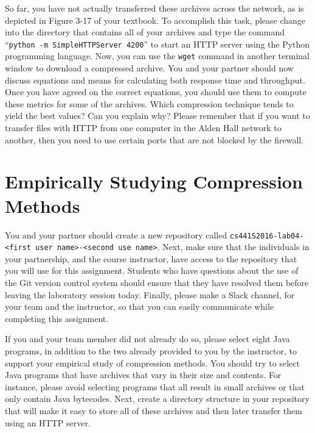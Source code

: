 So far, you have not actually transferred these archives across the network, as is depicted in Figure 3-17 of your
textbook. To accomplish this task, please change into the directory that contains all of your archives and type the
command ``{\tt python -m SimpleHTTPServer 4200}'' to start an HTTP server using the Python programming language. Now,
you can use the {\tt wget} command in another terminal window to download a compressed archive. You and your partner
should now discuss equations and means for calculating both response time and throughput. Once you have agreed on the
correct equations, you should use them to compute these metrics for some of the archives. Which compression technique
tends to yield the best values? Can you explain why? Please remember that if you want to transfer files with HTTP from
one computer in the Alden Hall network to another, then you need to use certain ports that are not blocked by the
firewall.

\section*{Empirically Studying Compression Methods}

You and your partner should create a new repository called {\tt cs441S2016-lab04-<first user name>-<second use
name>}.  Next, make sure that the individuals in your partnership, and the course instructor, have access to the
repository that you will use for this assignment.  Students who have questions about the use of the Git version control
system should ensure that they have resolved them before leaving the laboratory session today. Finally, please make a
Slack channel, for your team and the instructor, so that you can easily communicate while completing this assignment.

If you and your team member did not already do so, please select eight Java programs, in addition to the two already
provided to you by the instructor, to support your empirical study of compression methods. You should try to select
Java programs that have archives that vary in their size and contents. For instance, please avoid selecting programs
that all result in small archives or that only contain Java bytecodes. Next, create a directory structure in your
repository that will make it easy to store all of these archives and then later transfer them using an HTTP server.

